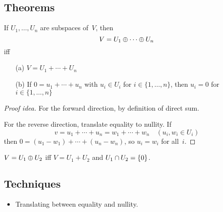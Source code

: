 \subsection*{Theorems}
\begin{thm}
If \(U_1,\ldots,U_n\) are subspaces of~\(V\), then
\[V=U_1\oplus\cdots\oplus U_n\]
iff
\begin{enumerate}[itemsep=0pt]
\item[(a)] \(V=U_1+\cdots+U_n\)
\item[(b)] If \(0=u_1+\cdots+u_n\) with \(u_i\in U_i\) for \(i\in\{1,\ldots,n\}\), then \(u_i=0\) for \(i\in\{1,\ldots,n\}\)
\end{enumerate}
\end{thm}
\begin{proof}[Proof idea]
For the forward direction, by definition of direct sum.

For the reverse direction, translate equality to nullity. If
\[v=u_1+\cdots+u_n=w_1+\cdots+w_n\quad(u_i,w_i\in U_i)\]
then \(0=(u_1-w_1)+\cdots+(u_n-w_n)\), so \(u_i=w_i\) for all~\(i\).
\end{proof}

\begin{cor}
\(V=U_1\oplus U_2\) iff \(V=U_1+U_2\) and \(U_1\cap U_2=\{0\}\).
\end{cor}

\subsection*{Techniques}
\begin{itemize}[itemsep=0pt]
\item Translating between equality and nullity.
\end{itemize}
